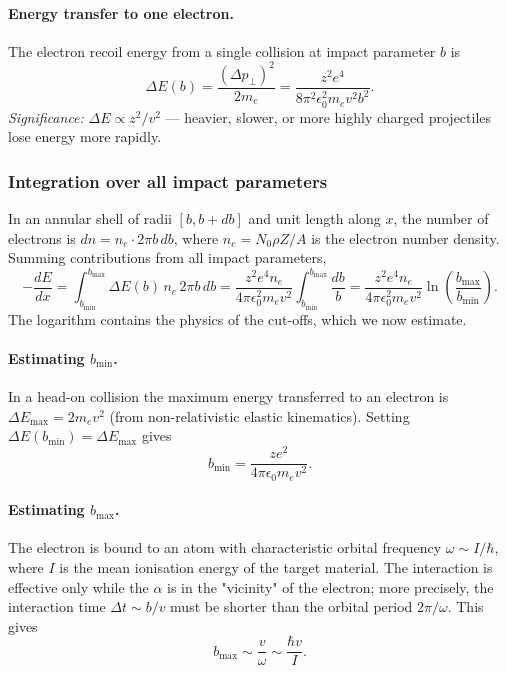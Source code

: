 \paragraph{Energy transfer to one electron.}
The electron recoil energy from a single collision at impact parameter $b$ is
\begin{equation}
  \label{eq:lec06:delta_E_b}
  \boxed{\Delta E(b) = \frac{(\Delta p_\perp)^2}{2m_e}
    = \frac{z^2 e^4}{8\pi^2 \epsilon_0^2 m_e v^2 b^2}.}
\end{equation}
\textit{Significance:} $\Delta E \propto z^2/v^2$ — heavier, slower, or more
highly charged projectiles lose energy more rapidly.

\subsubsection*{Integration over all impact parameters}
In an annular shell of radii $[b,b+db]$ and unit length along $x$, the number
of electrons is $dn = n_e \cdot 2\pi b\,db$, where $n_e = N_0 \rho Z / A$ is
the electron number density.  Summing contributions from all impact parameters,
\begin{equation}
  \label{eq:lec06:dEdx_integral}
  -\frac{dE}{dx} = \int_{b_\text{min}}^{b_\text{max}}
    \Delta E(b)\,n_e\,2\pi b\,db
    = \frac{z^2 e^4 n_e}{4\pi\epsilon_0^2 m_e v^2}
      \int_{b_\text{min}}^{b_\text{max}} \frac{db}{b}
    = \frac{z^2 e^4 n_e}{4\pi\epsilon_0^2 m_e v^2}
      \ln\!\left(\frac{b_\text{max}}{b_\text{min}}\right).
\end{equation}
The logarithm contains the physics of the cut-offs, which we now estimate.

\paragraph{Estimating $b_\text{min}$.}
In a head-on collision the maximum energy transferred to an electron is
$\Delta E_\text{max} = 2m_e v^2$ (from non-relativistic elastic kinematics).
Setting $\Delta E(b_\text{min}) = \Delta E_\text{max}$ gives
\begin{equation}
  \label{eq:lec06:bmin}
  b_\text{min} = \frac{ze^2}{4\pi\epsilon_0 m_e v^2}.
\end{equation}

\paragraph{Estimating $b_\text{max}$.}
The electron is bound to an atom with characteristic orbital frequency
$\omega \sim I/\hbar$, where $I$ is the mean ionisation energy of the target
material.  The interaction is effective only while the $\alpha$ is in the
"vicinity" of the electron; more precisely, the interaction time $\Delta t \sim
b/v$ must be shorter than the orbital period $2\pi/\omega$.  This gives
\begin{equation}
  \label{eq:lec06:bmax}
  b_\text{max} \sim \frac{v}{\omega} \sim \frac{\hbar v}{I}.
\end{equation}


